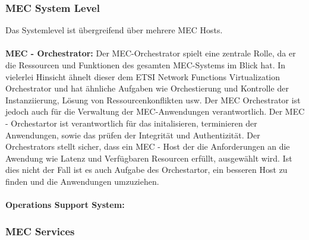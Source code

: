 \documentclass[runningheads]{llncs}
\numberwithin{figure}{section}
\begin{document}
\subsubsection{MEC System Level}
Das Systemlevel ist übergreifend über mehrere MEC Hosts. 
\\
\\
\textbf{MEC - Orchestrator:}
Der MEC-Orchestrator spielt eine zentrale Rolle, 
da er die Ressourcen und Funktionen des gesamten MEC-Systems im Blick hat. 
In vielerlei Hinsicht ähnelt dieser dem ETSI Network Functions Virtualization Orchestrator und hat ähnliche 
Aufgaben wie Orchestierung und Kontrolle der Instanziierung, Lösung von Ressourcenkonflikten usw. 
Der MEC Orchestrator ist jedoch auch für die Verwaltung der MEC-Anwendungen verantwortlich. 
Der MEC - Orchestartor ist verantwortlich für das initalisieren, terminieren der Anwendungen, sowie das prüfen
der Integrität und Authentizität. Der Orchestrators stellt sicher, 
dass ein MEC - Host der die Anforderungen an die Awendung wie Latenz und Verfügbaren Resourcen erfüllt, ausgewählt wird.
Ist dies nicht der Fall ist es auch Aufgabe des Orchestartor, ein besseren Host zu finden und die Anwendungen umzuziehen.
\\
\\
\textbf{Operations Support System:}

\subsubsection{MEC Services}

\newpage
\end{document}
